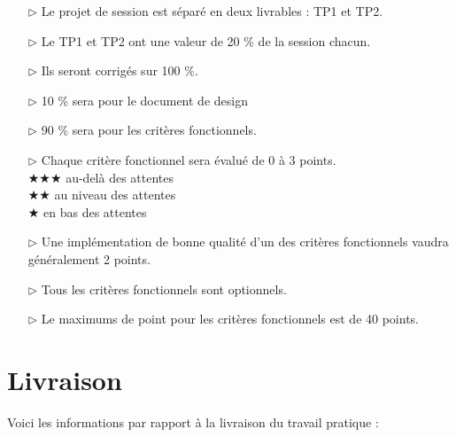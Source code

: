 \documentclass[12pt]{article}
\newcommand{\state}{\noindent}
\begin{document}
\begin{itemize}
\item[$\triangleright$] Le projet de session est séparé en deux livrables : TP1 et TP2.
\item[$\triangleright$] Le TP1 et TP2 ont une valeur de 20 \% de la session chacun.
\item[$\triangleright$] Ils seront corrigés sur 100 \%.
\item[$\triangleright$] 10 \% sera pour le document de design
\item[$\triangleright$] 90 \% sera pour les critères fonctionnels.
\item[$\triangleright$] Chaque critère fonctionnel sera évalué de 0 à 3 points. \\
$\bigstar\bigstar\bigstar$ au-delà des attentes\\
$\bigstar\bigstar$ au niveau des attentes\\
$\bigstar$ en bas des attentes
\item[$\triangleright$] Une implémentation de bonne qualité d'un des critères fonctionnels vaudra généralement 2 points.
\item[$\triangleright$] Tous les critères fonctionnels sont optionnels.
\item[$\triangleright$] Le maximums de point pour les critères fonctionnels est de 40 points. \\
\end{itemize}

\pagebreak

\section*{Livraison}

\state
Voici les informations par rapport à la livraison du travail pratique :
\end{document}
